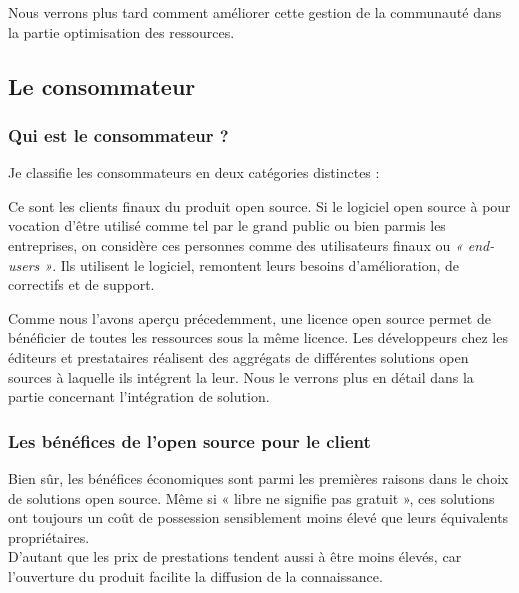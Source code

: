 				Nous verrons plus tard comment améliorer cette gestion de la communauté dans la partie optimisation des ressources.

		\subsection{Le consommateur}

			\subsubsection{Qui est le consommateur ?}

			Je classifie les consommateurs en deux catégories distinctes :
			\begin{description}[font=\color{burntorange}]
				\item[Les end-users:] Ce sont les clients finaux du produit open source. Si le logiciel open source à pour vocation d'être utilisé comme tel par le grand public ou bien parmis les entreprises, on considère ces personnes comme des utilisateurs finaux ou \textit{« end-users »}. Ils utilisent le logiciel, remontent leurs besoins d'amélioration, de correctifs et de support.
				\item[Les autres éditeurs et prestataires:] Comme nous l'avons aperçu précedemment, une licence open source permet de bénéficier de toutes les ressources sous la même licence. Les développeurs chez les éditeurs et prestataires réalisent des aggrégats de différentes solutions open sources à laquelle ils intégrent la leur. Nous le verrons plus en détail dans la partie concernant l'intégration de solution.
			\end{description}
			
			\subsubsection{Les bénéfices de l'open source pour le client}

			Bien sûr, les bénéfices économiques sont parmi les premières raisons dans le choix de solutions open source. Même si « libre ne signifie pas gratuit », ces solutions ont toujours un coût de possession sensiblement moins élevé que leurs équivalents propriétaires.\\

			D'autant que les prix de prestations tendent aussi à être moins élevés, car l'ouverture du produit facilite la diffusion de la connaissance.\\

